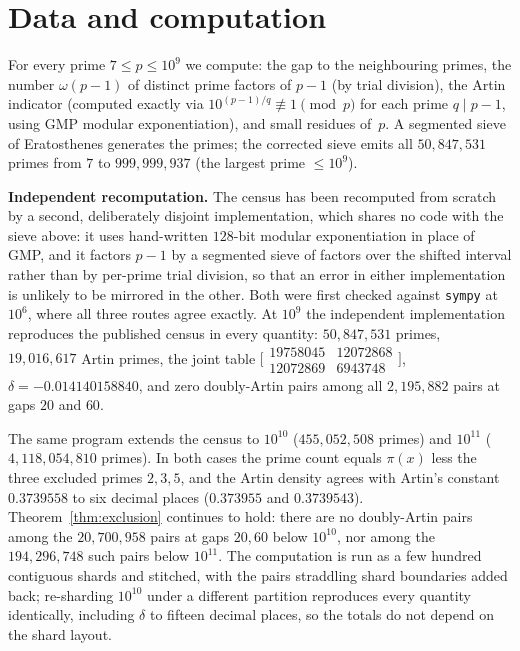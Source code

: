 \documentclass[11pt]{amsart}
\theoremstyle{definition}
\begin{document}
\section{Data and computation}
\label{sec:data}

For every prime $7 \le p \le 10^9$ we compute: the gap to the neighbouring
primes, the number $\omega(p-1)$ of distinct prime factors of $p - 1$ (by
trial division), the Artin indicator (computed exactly via
$10^{(p-1)/q} \not\equiv 1 \pmod p$ for each prime $q \mid p - 1$, using GMP
modular exponentiation), and small residues of~$p$. A segmented sieve of
Eratosthenes generates the primes; the corrected sieve emits all
$50{,}847{,}531$ primes from $7$ to $999{,}999{,}937$ (the largest prime
$\le 10^9$).

\textbf{Independent recomputation.} The census has been recomputed from
scratch by a second, deliberately disjoint implementation, which shares no
code with the sieve above: it uses hand-written $128$-bit modular
exponentiation in place of GMP, and it factors $p-1$ by a segmented sieve of
factors over the shifted interval rather than by per-prime trial division, so
that an error in either implementation is unlikely to be mirrored in the
other. Both were first checked against \texttt{sympy} at $10^6$, where all
three routes agree exactly. At $10^9$ the independent implementation
reproduces the published census in every quantity: $50{,}847{,}531$ primes,
$19{,}016{,}617$ Artin primes, the joint table
$\bigl[\begin{smallmatrix}19758045 & 12072868\\ 12072869 & 6943748\end{smallmatrix}\bigr]$,
$\delta = -0.014140158840$, and zero doubly-Artin pairs among all
$2{,}195{,}882$ pairs at gaps $20$ and $60$.

The same program extends the census to $10^{10}$ ($455{,}052{,}508$ primes)
and $10^{11}$ ($4{,}118{,}054{,}810$ primes). In both cases the prime count
equals $\pi(x)$ less the three excluded primes $2, 3, 5$, and the Artin
density agrees with Artin's constant $0.3739558$ to six decimal places
($0.373955$ and $0.3739543$). Theorem~\ref{thm:exclusion} continues to hold:
there are no doubly-Artin pairs among the $20{,}700{,}958$ pairs at gaps
$20, 60$ below $10^{10}$, nor among the $194{,}296{,}748$ such pairs below
$10^{11}$. The computation is run as a few hundred contiguous shards and
stitched, with the pairs straddling shard boundaries added back; re-sharding
$10^{10}$ under a different partition reproduces every quantity identically,
including $\delta$ to fifteen decimal places, so the totals do not depend on
the shard layout.
\end{document}
